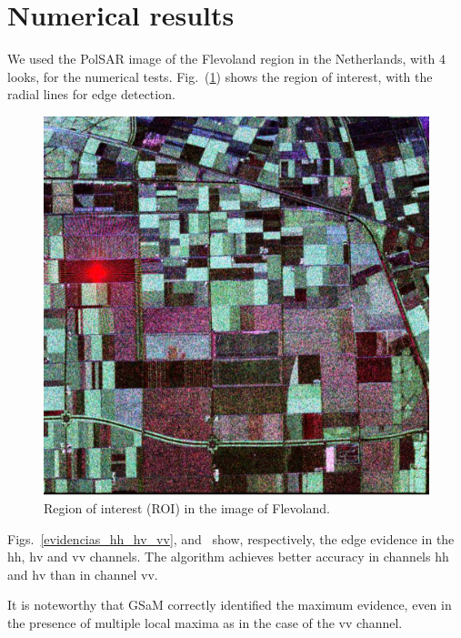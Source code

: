 \documentclass[conference]{IEEEtran}
\begin{document}
\section{Numerical results}\label{sec_08}

We used the PolSAR image of the Flevoland region in the Netherlands, with $4$ looks, for the numerical tests. 
Fig.~(\ref{flevoland_radial_4look}) shows the region of interest, with the radial lines for edge detection.

\begin{figure}[hbt]
\centering
	\includegraphics[width=\linewidth]{flevoland_radial_4_look}
	\caption{Region of interest (ROI) in the image of Flevoland.}
\label{flevoland_radial_4look}
\end{figure}

Figs.~\ref{evidencias_hh_hv_vv},  and~ show, respectively, the edge evidence in the $\text{hh}$, $\text{hv}$ and $\text{vv}$ channels. 
The algorithm achieves better accuracy in channels $\text{hh}$ and $\text{hv}$ than in channel $\text{vv}$.  

It is noteworthy that GSaM correctly identified the maximum evidence, even in the presence of multiple local maxima as in the case of the $\text{vv}$ channel.
\end{document}

